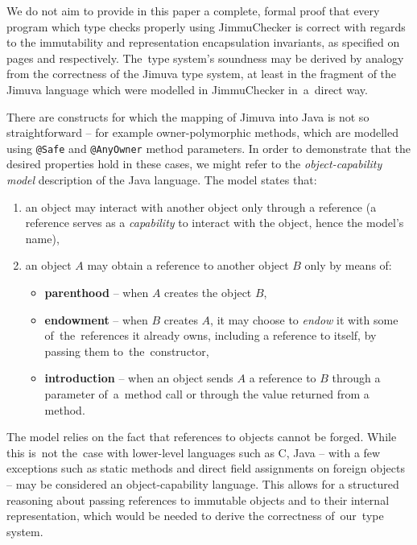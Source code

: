 \documentclass{pracamgr}
\theoremstyle{break}
\theoremstyle{break}
\theoremstyle{break}
\begin{document}
We do not aim to provide in this paper a complete, formal proof that
every program which type checks properly using JimmuChecker is
correct with regards to the immutability and representation
encapsulation invariants, as specified on pages \pageref{inv:open} and
\pageref{inv:encap} respectively. The~type system's soundness may be
derived by analogy from the correctness of the Jimuva type system, at
least in the fragment of the Jimuva language which were modelled in
JimmuChecker in~a~direct way.

There are constructs for which the mapping of Jimuva into Java is not
so straightforward -- for example owner-polymorphic methods, which are
modelled using \texttt{@Safe} and \texttt{@AnyOwner} method
parameters. In order to demonstrate that the desired properties hold
in these cases, we might refer to the \emph{object-capability model}
description \cite{object-cap} of the Java language. The model states
that:
\begin{enumerate}
\item an object may interact with another object only through a
  reference (a reference serves as a \emph{capability} to interact
  with the object, hence the model's name),
\item an object $A$ may obtain a reference to another object $B$ only
  by means of:
  \begin{itemize}
  \item \textbf{parenthood} -- when $A$ creates the object $B$, 
  \item \textbf{endowment} -- when $B$ creates $A$, it may choose to
    \emph{endow} it with some of~the~re\-fe\-ren\-ces it already owns,
    including a reference to itself, by passing them
    to~the~constructor,
  \item \textbf{introduction} -- when an object sends $A$ a reference
    to $B$ through a parameter of~a~method call or through the value
    returned from a method.
  \end{itemize}
\end{enumerate}
The model relies on the fact that references to objects cannot be
forged. While this is~not the~case with lower-level languages such as
C, Java -- with a few exceptions such as static methods and direct
field assignments on foreign objects -- may be considered an
object-capability language. This allows for a structured reasoning
about passing references to immutable objects and to their internal
representation, which would be needed to derive the correctness
of~our~type system.
\end{document}
